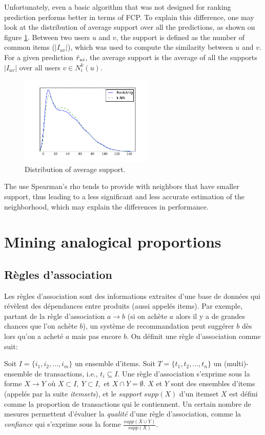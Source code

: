 Unfortunately, even a basic algorithm that was not designed for ranking
prediction performs better in terms of FCP. To explain this difference, one may
look at the distribution of average support over all the predictions, as shown
on figure \ref{FIG_SUPPORT}. Between
two users $u$ and $v$, the support is defined as the number of common items
($|I_{uv}|$), which was used to compute the similarity between $u$ and $v$. For
a given prediction $\hat{r}_{ui}$, the average support is the average of all the
supports $|I_{uv}|$ over all users $v \in N_i^k(u)$.

\begin{figure}[!h]
\centering
\includegraphics[width=2.5in]{figures/support.pdf}
\caption{Distribution of average support.}
\label{FIG_SUPPORT}
\end{figure}

The use Spearman's rho tends to provide with neighbors that have smaller
support, thus leading to a less significant and less accurate estimation of the
neighborhood, which may explain the differences in performance.

\section{Mining analogical proportions}

\subsection{Règles d'association}
Les règles d'association sont des informations extraites d'une base de
données qui révèlent des dépendances entre produits (aussi appelés
items).  Par exemple, partant
de la règle d'association $a \rightarrow b$  (si on achète $a$ alors il y a
de grandes chances que l'on achète $b$), un système de recommandation peut
suggérer $b$ dès lors qu'on a acheté $a$ mais pas encore $b$.  On définit
une règle d'association comme suit:

Soit $I= \{i_1,i_2,...,i_m \}$ un ensemble d'items. Soit $T= \{t_1, t_2,...,t_n
\}$ un (multi)-ensemble de transactions, i.e.,  $t_i \subseteq  I$. Une règle
d'association s'exprime sous la forme $X \rightarrow Y$ o\`u $X \subset I ,~ Y
\subset I, $ et $X \cap Y = \emptyset$.  $X$ et $Y$ sont des ensembles d'items
(appelés par la suite \textit{itemsets}), et le \emph{support} $supp(X)$ d'un
itemset $X$ est défini comme la proportion de
transactions qui le contiennent.  Un certain nombre de mesures permettent
d'\'evaluer la {\it qualité} d'une règle d'association, comme  la
\emph{confiance} qui s'exprime sous la forme $\frac{supp( X \cup Y)}{supp(X)}$.

